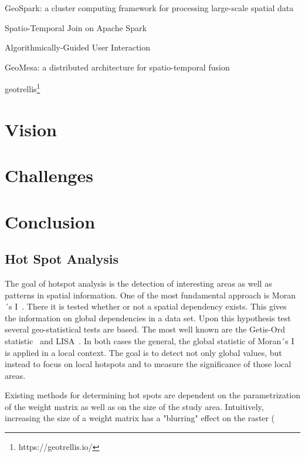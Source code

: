 \documentclass[a4paper,UKenglish]{lipics-v2016}
\begin{document}
GeoSpark: a cluster computing framework for processing large-scale spatial data \cite{Yu:2015:GCC:2820783.2820860}

Spatio-Temporal Join on Apache Spark \cite{Whitman:2017:SJA:3139958.3139963}

Algorithmically-Guided User Interaction \cite{vanDijk:2017:AUI:3139958.3140032}

GeoMesa: a distributed architecture for spatio-temporal fusion \cite{hughes2015geomesa}

geotrellis\footnote{https://geotrellis.io/}

\section{Vision}

\section{Challenges}

\section{Conclusion}






\subsection{Hot Spot Analysis}
The goal of hotspot analysis is the detection of interesting areas as well as patterns in spatial information. One of the most fundamental approach is Moran´s I~\cite{MoranI}. There it is tested whether or
not a spatial dependency exists. This gives the information on global
dependencies in a data set. Upon this hypothesis test several geo-statistical
tests are based. The most well known are the Getis-Ord statistic~\cite{Ord.1995}
and LISA~\cite{Anselin.1995}. In both cases the general, the global statistic of
Moran´s I is applied in a local context. The goal is to detect not only global
values, but instead to focus on local hotspots and to measure the significance
of those local areas. 

Existing methods for determining hot spots are dependent on the parametrization
of the weight matrix as well as on the size of the study area. Intuitively,
increasing the size of a weight matrix has a "blurring" effect on the raster
(
\end{document}
